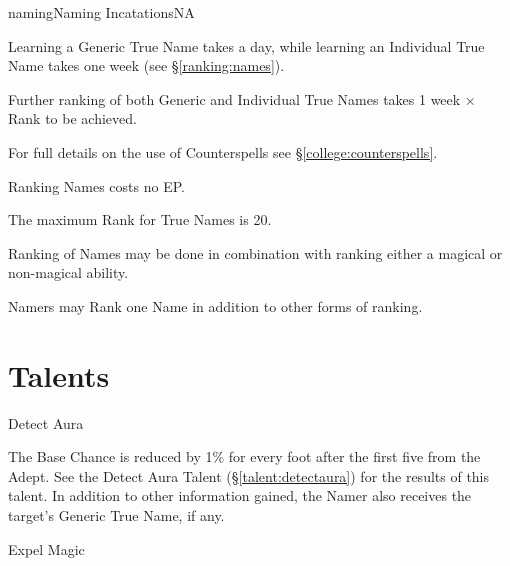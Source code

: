 \begin{College}[2.0]{naming}{Naming Incatations}{NA}
\begin{Itemize}
\item Learning a Generic True Name takes a day, while learning an
  Individual True Name takes one week (see \S\ref{ranking:names}).

\item Further ranking of both Generic and Individual True Names takes
  1 week × Rank to be achieved.
\end{Itemize}

For full details on the use of Counterspells see \S\ref{college:counterspells}.

\begin{Itemize}
\item Ranking Names costs no EP.  
\item The maximum Rank for True Names is 20.  
\item Ranking of Names may be done in combination with ranking either
  a magical or non-magical ability.
\item Namers may Rank one Name in addition to other forms of ranking.
\end{Itemize}


\section{Talents}

\begin{talent}[T-1]{Detect Aura}

\begin{effects}
The Base Chance is reduced by 1\% for every foot after the first five
from the Adept.  See the Detect Aura Talent
(\S\ref{talent:detectaura}) for the results of this talent.  In
addition to other information gained, the Namer also receives the
target’s Generic True Name, if any.
\end{effects}
\end{talent}

\begin{talent}[T-2]{Expel Magic}


\end{talent}
\end{College}
